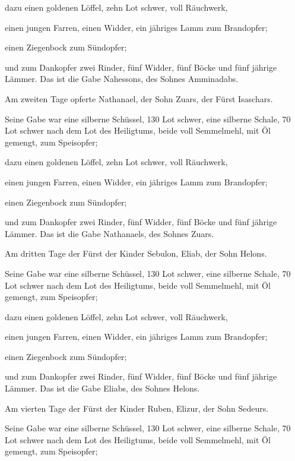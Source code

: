  dazu einen goldenen Löffel, zehn Lot schwer, voll
Räuchwerk,

 einen jungen Farren, einen Widder, ein jähriges Lamm zum
Brandopfer;

 einen Ziegenbock zum Sündopfer;

 und zum Dankopfer zwei Rinder, fünf Widder, fünf Böcke
und fünf jährige Lämmer. Das ist die Gabe Nahessons, des Sohnes
Amminadabs.

 Am zweiten Tage opferte Nathanael, der Sohn Zuars, der
Fürst Isaschars.

 Seine Gabe war eine silberne Schüssel, 130 Lot schwer,
eine silberne Schale, 70 Lot schwer nach dem Lot des Heiligtums, beide
voll Semmelmehl, mit Öl gemengt, zum Speisopfer;

 dazu einen goldenen Löffel, zehn Lot schwer, voll
Räuchwerk,

 einen jungen Farren, einen Widder, ein jähriges Lamm zum
Brandopfer;

 einen Ziegenbock zum Sündopfer;

 und zum Dankopfer zwei Rinder, fünf Widder, fünf Böcke
und fünf jährige Lämmer. Das ist die Gabe Nathanaels, des Sohnes Zuars.

 Am dritten Tage der Fürst der Kinder Sebulon, Eliab, der
Sohn Helons.

 Seine Gabe war eine silberne Schüssel, 130 Lot schwer,
eine silberne Schale, 70 Lot schwer nach dem Lot des Heiligtums, beide
voll Semmelmehl, mit Öl gemengt, zum Speisopfer;

 dazu einen goldenen Löffel, zehn Lot schwer, voll
Räuchwerk,

 einen jungen Farren, einen Widder, ein jähriges Lamm zum
Brandopfer;

 einen Ziegenbock zum Sündopfer;

 und zum Dankopfer zwei Rinder, fünf Widder, fünf Böcke
und fünf jährige Lämmer. Das ist die Gabe Eliabs, des Sohnes Helons.

 Am vierten Tage der Fürst der Kinder Ruben, Elizur, der
Sohn Sedeurs.

 Seine Gabe war eine silberne Schüssel, 130 Lot schwer,
eine silberne Schale, 70 Lot schwer nach dem Lot des Heiligtums, beide
voll Semmelmehl, mit Öl gemengt, zum Speisopfer;

